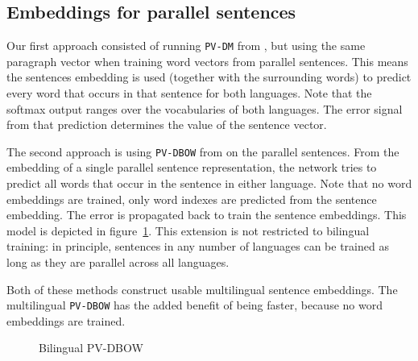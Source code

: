 \subsection{Embeddings for parallel sentences}



Our first approach consisted of running \texttt{PV-DM} from \cite{Le2014}, 
but using the same paragraph vector when training word vectors from parallel sentences. 
This means the sentences embedding is used (together with the surrounding words) to predict every word that occurs in that sentence for both languages. Note that the softmax output ranges over the vocabularies of both languages.
The error signal from that prediction determines the value of the sentence vector.



The second approach is using \texttt{PV-DBOW} from \cite{Le2014} on the parallel sentences.
From the embedding of a single parallel sentence representation, the network tries to predict all words that occur in the sentence in either language.
Note that no word embeddings are trained, only word indexes are predicted from the sentence embedding.
The error is propagated back to train the sentence embeddings.
This model is depicted in figure~\ref{f:bilingual_dbow}. This extension is not restricted to bilingual training: in principle, sentences in any number of languages can be trained as long as they are parallel across all languages.


Both of these methods construct usable multilingual sentence embeddings.
The multilingual \texttt{PV-DBOW} has the added benefit of being faster, because no word embeddings are trained.


\begin{figure}

\center

\caption{Bilingual PV-DBOW}
\label{f:bilingual_dbow}
\end{figure}


% 

